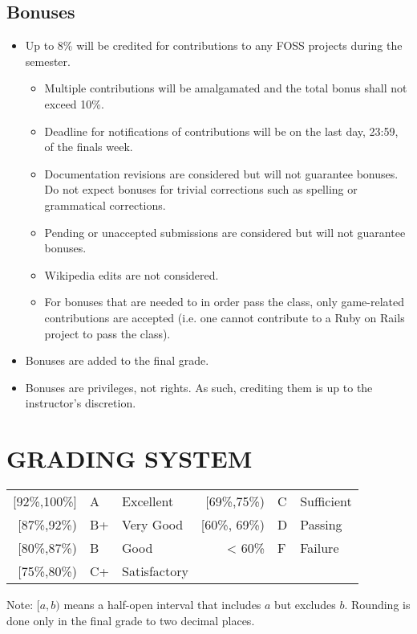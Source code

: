 \documentclass[10pt]{article}
\begin{document}
\subsection{Bonuses}
\begin{itemize}[noitemsep]

\item Up to 8\% will be credited for contributions to any FOSS projects during the semester.
	\begin{itemize}[noitemsep]
		\item Multiple contributions will be amalgamated and the total bonus shall not exceed 10\%.
		\item Deadline for notifications of contributions will be on the last day, 23:59, of the finals week.
		\item Documentation revisions are considered but will not guarantee bonuses. Do not expect bonuses for trivial corrections such as spelling or grammatical corrections.
		\item Pending or unaccepted submissions are considered but will not guarantee bonuses.
		\item Wikipedia edits are not considered.
		\item For bonuses that are needed to in order pass the class, only game-related contributions are accepted (i.e. one cannot contribute to a Ruby on Rails project to pass the class).
	\end{itemize}
\item Bonuses are added to the final grade.
\item Bonuses are privileges, not rights. As such, crediting them is up to the instructor's discretion.
\end{itemize}

\section{GRADING SYSTEM}
\begin{center}
	\begin{tabular}{rll|rll}
	{[}92\%,100\%] & A & Excellent & 	{[}69\%,75\%) & C & Sufficient\\
	{[}87\%,92\%) & B+ & Very Good &			{[}60\%, 69\%) & D & Passing\\
	{[}80\%,87\%) & B & Good & 			< 60\% & F & Failure\\
	{[}75\%,80\%) & C+ & Satisfactory \\
	\end{tabular}
\end{center}
Note: $[a,b)$ means a half-open interval that includes $a$ but excludes $b$. Rounding is done only in the final grade to two decimal places.
\end{document}
